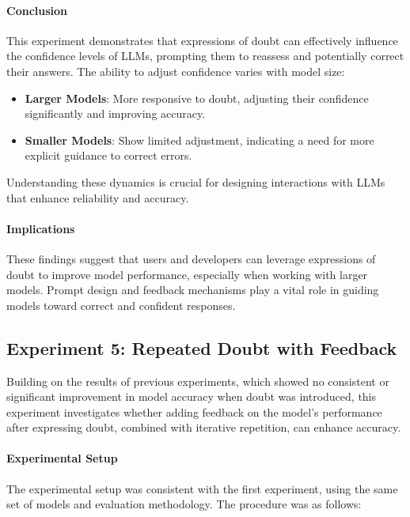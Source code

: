 \paragraph{Conclusion}

This experiment demonstrates that expressions of doubt can effectively influence the confidence levels of LLMs, prompting them to reassess and potentially correct their answers. The ability to adjust confidence varies with model size:

\begin{itemize}
    \item \textbf{Larger Models}: More responsive to doubt, adjusting their confidence significantly and improving accuracy.
    \item \textbf{Smaller Models}: Show limited adjustment, indicating a need for more explicit guidance to correct errors.
\end{itemize}

Understanding these dynamics is crucial for designing interactions with LLMs that enhance reliability and accuracy.

\paragraph{Implications}

These findings suggest that users and developers can leverage expressions of doubt to improve model performance, especially when working with larger models. Prompt design and feedback mechanisms play a vital role in guiding models toward correct and confident responses.


\subsection{Experiment 5: Repeated Doubt with Feedback}

Building on the results of previous experiments, which showed no consistent or significant improvement in model accuracy when doubt was introduced, this experiment investigates whether adding feedback on the model's performance after expressing doubt, combined with iterative repetition, can enhance accuracy.

\paragraph{Experimental Setup}
The experimental setup was consistent with the first experiment, using the same set of models and evaluation methodology. The procedure was as follows:

